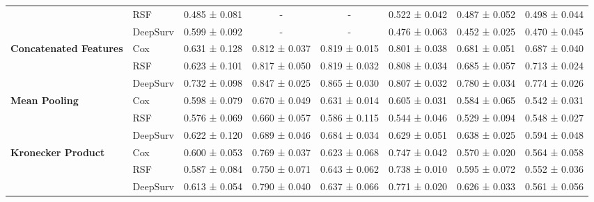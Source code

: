 \begin{sidewaystable}[htbp]
\begin{tabular}{@{}llcccccc@{}}
        & RSF & 0.485 ± 0.081 & - & - & 0.522 ± 0.042 & 0.487 ± 0.052 & 0.498 ± 0.044 \\
        & DeepSurv & 0.599 ± 0.092 & - & - & 0.476 ± 0.063 & 0.452 ± 0.025 & 0.470 ± 0.045 \\
        \midrule
        \multirow{3}{*}{\textbf{Concatenated Features}} & Cox & 0.631 ± 0.128 & 0.812 ± 0.037 & 0.819 ± 0.015 & 0.801 ± 0.038 & 0.681 ± 0.051 & 0.687 ± 0.040 \\
        & RSF & 0.623 ± 0.101 & 0.817 ± 0.050 & 0.819 ± 0.032 & 0.808 ± 0.034 & 0.685 ± 0.057 & 0.713 ± 0.024 \\
        & DeepSurv & 0.732 ± 0.098 & 0.847 ± 0.025 & 0.865 ± 0.030 & 0.807 ± 0.032 & 0.780 ± 0.034 & 0.774 ± 0.026 \\
        \midrule
        \multirow{3}{*}{\textbf{Mean Pooling}} & Cox & 0.598 ± 0.079 & 0.670 ± 0.049 & 0.631 ± 0.014 & 0.605 ± 0.031 & 0.584 ± 0.065 & 0.542 ± 0.031 \\
        & RSF & 0.576 ± 0.069 & 0.660 ± 0.057 & 0.586 ± 0.115 & 0.544 ± 0.046 & 0.529 ± 0.094 & 0.548 ± 0.027 \\
        & DeepSurv & 0.622 ± 0.120 & 0.689 ± 0.046 & 0.684 ± 0.034 & 0.629 ± 0.051 & 0.638 ± 0.025 & 0.594 ± 0.048 \\
        \midrule
        \multirow{3}{*}{\textbf{Kronecker Product}} & Cox & 0.600 ± 0.053 & 0.769 ± 0.037 & 0.623 ± 0.068 & 0.747 ± 0.042 & 0.570 ± 0.020 & 0.564 ± 0.058 \\
        & RSF & 0.587 ± 0.084 & 0.750 ± 0.071 & 0.643 ± 0.062 & 0.738 ± 0.010 & 0.595 ± 0.072 & 0.552 ± 0.036 \\
        & DeepSurv & 0.613 ± 0.054 & 0.790 ± 0.040 & 0.637 ± 0.066 & 0.771 ± 0.020 & 0.626 ± 0.033 & 0.561 ± 0.056 \\
        \bottomrule
    \end{tabular}
\end{sidewaystable}